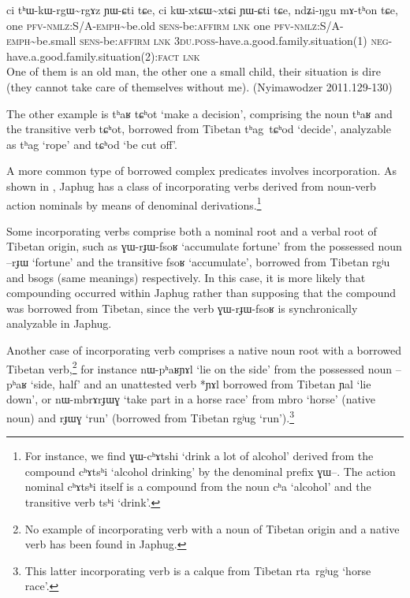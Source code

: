\documentclass[oldfontcommands,oneside,a4paper,11pt]{article}
\newcommand{\ipa}[1]{{\phon \mbox{#1}}} %
\begin{document}
\begin{exe}
\ex \label{ex:ndZiNgu.mAthon}
\gll
\ipa{ci}  	\ipa{tʰɯ-kɯ-rgɯ\textasciitilde{}rgɤz}  	\ipa{ɲɯ-ɕti}  	\ipa{tɕe,}  	\ipa{ci}  	\ipa{kɯ-xtɕɯ\textasciitilde{}xtɕi}  	\ipa{ɲɯ-ɕti}  	\ipa{tɕe,}  	\ipa{ndʑi-ŋgu}  	\ipa{mɤ-tʰon}  	\ipa{tɕe,}  	  \\
one \textsc{pfv-nmlz}:S/A-\textsc{emph}\textasciitilde{}be.old \textsc{sens}-be:\textsc{affirm} \textsc{lnk} one \textsc{pfv-nmlz}:S/A-\textsc{emph}\textasciitilde{}be.small \textsc{sens}-be:\textsc{affirm} \textsc{lnk} \textsc{3du.poss}-have.a.good.family.situation(1) \textsc{neg}-have.a.good.family.situation(2):\textsc{fact} \textsc{lnk} \\
\glt One of them is an old man, the other one a small child, their situation is dire (they cannot take care of themselves without me). (Nyimawodzer 2011.129-130)
\end{exe}  

The other example is \ipa{tʰaʁ} \ipa{tɕʰot} `make a decision', comprising the noun \ipa{tʰaʁ} and the transitive verb \ipa{tɕʰot}, borrowed from Tibetan  \ipa{tʰag tɕʰod} `decide', analyzable as \ipa{tʰag} `rope' and \ipa{tɕʰod} `be cut off'.

A more common type of borrowed complex predicates involves incorporation. As shown in \citet{jacques12incorp}, Japhug has a class of incorporating verbs derived from noun-verb action nominals by means of denominal derivations.\footnote{For instance, we find \ipa{ɣɯ-cʰɤtshi} `drink a lot of alcohol' derived from the compound \ipa{cʰɤtsʰi} `alcohol drinking' by the denominal prefix \ipa{ɣɯ--}. The action nominal \ipa{cʰɤtsʰi} itself is a compound from the noun \ipa{cʰa} `alcohol' and the transitive verb \ipa{tsʰi} `drink'.}

Some incorporating verbs comprise both a nominal root and a verbal root of Tibetan origin, such as \ipa{ɣɯ-rɟɯ-fsoʁ} `accumulate fortune' from the possessed noun \ipa{--rɟɯ} `fortune' and the transitive \ipa{fsoʁ} `accumulate', borrowed from Tibetan \ipa{rgʲu} and \ipa{bsogs} (same meanings) respectively. In this case, it is more likely that compounding occurred within Japhug rather than supposing that the compound was borrowed from Tibetan, since the verb \ipa{ɣɯ-rɟɯ-fsoʁ} is synchronically analyzable in Japhug.

Another case of incorporating verb comprises a native noun root with a borrowed Tibetan verb,\footnote{No example of incorporating verb with a noun of Tibetan origin and a native verb has been found in Japhug.} for instance  \ipa{nɯ-pʰaʁɲɤl} `lie on the side' from the possessed noun \ipa{--pʰaʁ} `side, half' and an unattested verb *\ipa{ɲɤl} borrowed from Tibetan \ipa{ɲal} `lie down', or \ipa{nɯ-mbrɤrɟɯɣ} `take part in a horse race' from \ipa{mbro} `horse' (native noun) and \ipa{rɟɯɣ} `run' (borrowed from Tibetan \ipa{rgʲug} `run').\footnote{This latter incorporating verb is a calque from Tibetan \ipa{rta rgʲug} `horse race'.}
  
\end{document}
